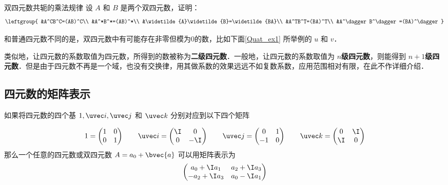 \begin{exercise}{双四元数共轭的乘法规律}
设 $A$ 和 $B$ 是两个双四元数，证明：
\begin{equation}
\leftgroup{
&A^CB^C=(AB)^C\\
&A^*B^*=(AB)^*\\
&\widetilde{A}\widetilde{B}=\widetilde{BA}\\
&A^TB^T=(BA)^T\\
&A^\dagger B^\dagger=(BA)^\dagger
}
\end{equation}

\end{exercise}

和普通四元数不同的是，双四元数中有可能存在非零但模为0的数，比如下面\autoref{Quat_ex1} 所举例的 $u$ 和 $v$．

类似地，让四元数的系数取值为四元数，所得到的数被称为\textbf{二级四元数}．一般地，让四元数的系数取值为 $n$\textbf{级四元数}，则能得到 $n+1$\textbf{级四元数}．但是由于四元数不再是一个域，也没有交换律，用其做系数的效果远远不如复数系数，应用范围相对有限，在此不作详细介绍．


\subsection{四元数的矩阵表示}

如果将四元数的四个基 $1, \uvec i, \uvec j$ 和 $\uvec k$ 分别对应到以下四个矩阵

\begin{equation}
1=\begin{pmatrix}1&0\\0&1\end{pmatrix} 
\qquad
\uvec i=\begin{pmatrix}\I&0\\0&-\I\end{pmatrix} 
\qquad
\uvec j=\begin{pmatrix}0&1\\-1&0\end{pmatrix} 
\qquad
\uvec k=\begin{pmatrix}0&\I\\\I&0\end{pmatrix} 
\end{equation}
那么一个任意的四元数或双四元数 $A=a_0+\bvec{a}$ 可以用矩阵表示为
\begin{equation}
\begin{pmatrix}a_0+\I a_1&a_2+\I a_3\\-a_2+\I a_3&a_0-\I a_1 \end{pmatrix} 
\end{equation}

